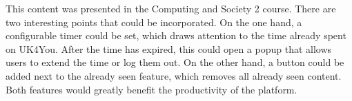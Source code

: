 This content was presented in the Computing and Society 2 course.
There are two interesting points that could be incorporated.
On the one hand, a configurable timer could be set, which draws attention to the time already spent on UK4You.
After the time has expired, this could open a popup that allows users to extend the time or log them out.
On the other hand, a button could be added next to the already seen feature, which removes all already seen content.
Both features would greatly benefit the productivity of the platform.
